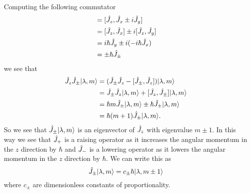 Computing the following commutator
\begin{align*}
    [\operator{J}_z, \operator{J}_{\pm}] &= [\operator{J}_z, \operator{J}_x \pm i\operator{J}_y]\\
    &= [\operator{J}_z, \operator{J}_x] \pm i[\operator{J}_z, \operator{J}_y]\\
    &= i\hbar\operator{J}_y \pm i(-i\hbar\operator{J}_x)\\
    &= \pm\hbar\operator{J}_{\pm}
\end{align*}
we see that
\begin{align*}
    \hat{J}_z\hat{J}_{\pm}\vert {\lambda, m} \rangle &= (\hat{J}_{\pm}\hat{J}_z - [\hat{J}_{\pm}, \hat{J}_z])\vert {\lambda, m} \rangle\\
    &= \hat{J}_{\pm}\hat{J}_z\vert {\lambda, m} \rangle + [\hat{J}_z, \hat{J}_{\pm}]\vert {\lambda, m} \rangle\\
    &= \hbar m\hat{J}_{\pm}\vert {\lambda, m} \rangle \pm \hbar\hat{J}_{\pm}\vert {\lambda, m} \rangle\\
    &= \hbar(m + 1)\hat{J}_{\pm}\vert {\lambda, m} \rangle.
\end{align*}
So we see that \(\hat{J}_{\pm}\vert {\lambda, m} \rangle\) is an eigenvector of \(\hat{J}_z\) with eigenvalue \(m \pm 1\).
In this way we see that \(\hat{J}_+\) is a raising operator as it increases the angular momentum in the \(z\) direction by \(\hbar\) and \(\hat{J}_-\) is a lowering operator as it lowers the angular momentum in the \(z\) direction by \(\hbar\).
We can write this as
\[\hat{J}_{\pm}\vert {\lambda, m} \rangle = c_{\pm}\hbar\vert {\lambda, m \pm 1} \rangle\]
where \(c_{\pm}\) are dimensionless constants of proportionality.

